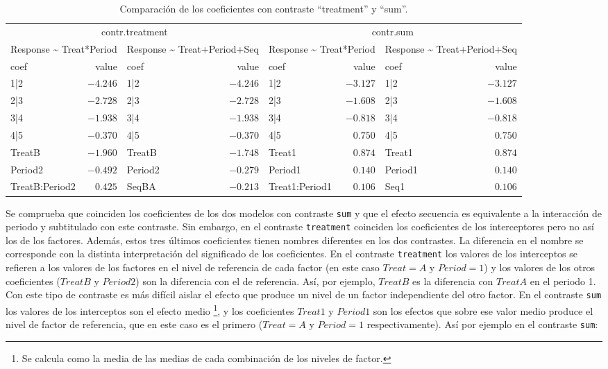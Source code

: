 \documentclass[
  12pt,
  a4paper,
  extrafontsizes,
  onecolumn,
  openright,
  table]{memoir}
\begin{document}
\hypertarget{tbl-contrast}{}
\begin{longtable}{lrlrlrlr}
\caption{\label{tbl-contrast}Comparación de los coeficientes con contraste ``treatment'' y ``sum''. }\tabularnewline

\toprule
\multicolumn{4}{c}{contr.treatment} & \multicolumn{4}{c}{contr.sum} \\ 
\cmidrule(lr){1-4} \cmidrule(lr){5-8}
\multicolumn{2}{c}{Response \textasciitilde{} Treat*Period} & \multicolumn{2}{c}{Response \textasciitilde{} Treat+Period+Seq} & \multicolumn{2}{c}{Response \textasciitilde{} Treat*Period} & \multicolumn{2}{c}{Response \textasciitilde{} Treat+Period+Seq} \\ 
\cmidrule(lr){1-2} \cmidrule(lr){3-4} \cmidrule(lr){5-6} \cmidrule(lr){7-8}
coef & value & coef & value & coef & value & coef & value \\ 
\midrule
1|2 & $-4.246$ & 1|2 & $-4.246$ & 1|2 & $-3.127$ & 1|2 & $-3.127$ \\ 
2|3 & $-2.728$ & 2|3 & $-2.728$ & 2|3 & $-1.608$ & 2|3 & $-1.608$ \\ 
3|4 & $-1.938$ & 3|4 & $-1.938$ & 3|4 & $-0.818$ & 3|4 & $-0.818$ \\ 
4|5 & $-0.370$ & 4|5 & $-0.370$ & 4|5 & $0.750$ & 4|5 & $0.750$ \\ 
TreatB & $-1.960$ & TreatB & $-1.748$ & Treat1 & $0.874$ & Treat1 & $0.874$ \\ 
Period2 & $-0.492$ & Period2 & $-0.279$ & Period1 & $0.140$ & Period1 & $0.140$ \\ 
TreatB:Period2 & $0.425$ & SeqBA & $-0.213$ & Treat1:Period1 & $0.106$ & Seq1 & $0.106$ \\ 
\bottomrule
\end{longtable}

\normalsize

Se comprueba que coinciden los coeficientes de los dos modelos con
contraste \texttt{sum} y que el efecto secuencia es equivalente a la
interacción de periodo y subtitulado con este contraste. Sin embargo, en
el contraste \texttt{treatment} coinciden los coeficientes de los
interceptores pero no así los de los factores. Además, estos tres
últimos coeficientes tienen nombres diferentes en los dos contrastes. La
diferencia en el nombre se corresponde con la distinta interpretación
del significado de los coeficientes. En el contraste \texttt{treatment}
los valores de los interceptos se refieren a los valores de los factores
en el nivel de referencia de cada factor (en este caso \(Treat = A\) y
\(Period = 1\)) y los valores de los otros coeficientes (\(TreatB\) y
\(Period2\)) son la diferencia con el de referencia. Así, por ejemplo,
\(TreatB\) es la diferencia con \(TreatA\) en el periodo 1. Con este
tipo de contraste es más difícil aislar el efecto que produce un nivel
de un factor independiente del otro factor. En el contraste \texttt{sum}
los valores de los interceptos son el efecto medio \footnote{Se calcula
  como la media de las medias de cada combinación de los niveles de
  factor.}, y los coeficientes \(Treat1\) y \(Period1\) son los efectos
que sobre ese valor medio produce el nivel de factor de referencia, que
en este caso es el primero (\(Treat = A\) y \(Period = 1\)
respectivamente). Así por ejemplo en el contraste \texttt{sum}:
\end{document}
